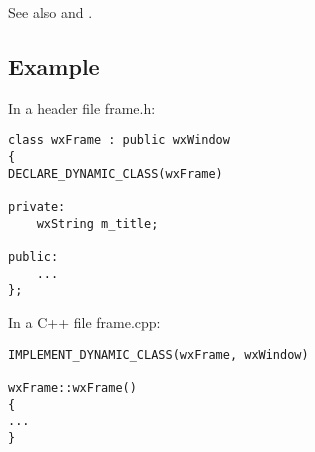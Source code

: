 See also  and .

\subsection{Example}\label{runtimeclassinformationexample}

In a header file frame.h:

\begin{verbatim}
class wxFrame : public wxWindow
{
DECLARE_DYNAMIC_CLASS(wxFrame)

private:
    wxString m_title;

public:
    ...
};
\end{verbatim}

In a C++ file frame.cpp:

\begin{verbatim}
IMPLEMENT_DYNAMIC_CLASS(wxFrame, wxWindow)

wxFrame::wxFrame()
{
...
}
\end{verbatim}


